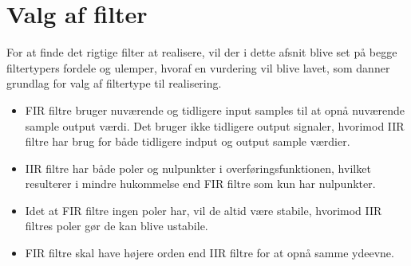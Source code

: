 \section{Valg af filter}\label{sec:dec_filter}
For at finde det rigtige filter at realisere, vil der i dette afsnit blive set på begge filtertypers fordele og ulemper, hvoraf en vurdering vil blive lavet, som danner grundlag for valg af filtertype til realisering.

\begin{itemize}
	\item FIR filtre bruger nuværende og tidligere input samples til at opnå nuværende sample output værdi. Det bruger ikke tidligere output signaler, hvorimod IIR filtre har brug for både tidligere indput og output sample værdier.
	\item IIR filtre har både poler og nulpunkter i overføringsfunktionen, hvilket resulterer i mindre hukommelse end FIR filtre som kun har nulpunkter.
	\item Idet at FIR filtre ingen poler har, vil de altid være stabile, hvorimod IIR filtres poler gør de kan blive ustabile.
	\item FIR filtre skal have højere orden end IIR filtre for at opnå samme ydeevne.
\end{itemize}


